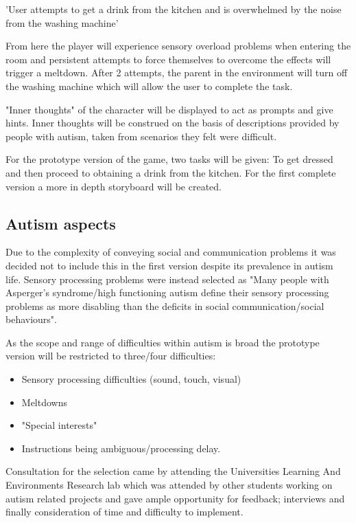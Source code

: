 \documentclass[11pt]{report}
\begin{document}
'User attempts to get a drink from the kitchen and is overwhelmed by the noise from the washing machine'

From here the player will experience sensory overload problems when entering the room and persistent attempts to force themselves to overcome the effects will trigger a meltdown. After 2 attempts, the parent in the environment will turn off the washing machine which will allow the user to complete the task.

"Inner thoughts" of the character will be displayed to act as prompts and give hints. Inner thoughts will be construed on the basis of descriptions provided by people with autism, taken from scenarios they felt were difficult.

For the prototype version of the game, two tasks will be given: To get dressed and then proceed to obtaining a drink from the kitchen. For the first complete version a more in depth storyboard will be created. 

\subsection{Autism aspects}
Due to the complexity of conveying social and communication problems it was decided not to include this in the first version despite its prevalence in autism life. Sensory processing problems were instead selected as "Many people with Asperger's syndrome/high functioning autism define their sensory processing problems as more disabling than the deficits in social communication/social behaviours"\cite{olgab}.

As the scope and range of difficulties within autism is broad the prototype version will be restricted to three/four difficulties:

\begin{itemize}
\item Sensory processing difficulties (sound, touch, visual)   
\item Meltdowns
\item "Special interests"
\item Instructions being ambiguous/processing delay.
\end{itemize}

Consultation for the selection came by attending the Universities Learning And Environments Research lab which was attended by other students working on autism related projects and gave ample opportunity for feedback; interviews and finally consideration of time and difficulty to implement.  
\end{document}
